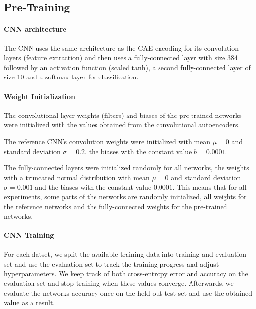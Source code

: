 \documentclass[draft]{article}
\begin{document}
  \subsection{Pre-Training}

    \paragraph{CNN architecture} The CNN uses the same architecture as the CAE encoding for its convolution layers (feature extraction) and then uses a fully-connected layer with size 384 followed by an activation function (scaled tanh), a second fully-connected layer of size 10 and a softmax layer for classification. 

    \paragraph{Weight Initialization}

    The convolutional layer weights (filters) and biases of the pre-trained networks were initialized with the values obtained from the convolutional autoencoders.

    The reference CNN's convolution weights were initialized with mean $\mu = 0 $ and standard deviation $\sigma = 0.2$, the biases with the constant value $b =  0.0001$.

    The fully-connected layers were initialized randomly for all networks, the weights with a truncated normal distribution with mean $\mu = 0$ and standard deviation $\sigma = 0.001$ and the biases with the constant value $0.0001$.
    This means that for all experiments, some parts of the networks are randomly initialized, all weights for the reference networks and the fully-connected weights for the pre-trained networks. 

    \paragraph{CNN Training}
    For each datset, we split the available training data into training and evaluation set and use the evaluation set to track the training progress and adjust hyperparameters. We keep track of both cross-entropy error and accuracy on the evaluation set and stop training when these values converge. Afterwards, we evaluate the networks accuracy once on the held-out test set and use the obtained value as a result. 
\end{document}
